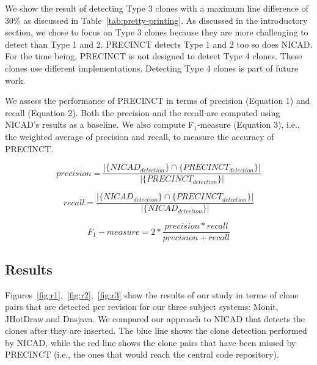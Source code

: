 \documentclass[conference]{IEEEtran}
\begin{document}
We show the result of detecting Type 3 clones with a maximum line difference of 30\% as discussed in Table~\ref{tab:pretty-printing}. As discussed in the introductory section, we chose to focus on Type 3 clones because they are more challenging to detect than Type 1 and 2. PRECINCT detects Type 1 and 2 too so does NICAD. For the time being, PRECINCT is not designed to detect Type 4 clones. These clones use different implementations. Detecting Type 4 clones is part of future work.


We assess the performance of PRECINCT in terms of precision (Equation 1) and recall (Equation 2).
Both the precision and the recall are computed using NICAD's results as a baseline.
We also compute F$_{1}$-measure (Equation 3), i.e., the weighted average of precision and recall, to measure the accuracy of PRECINCT.

\begin{equation}
precision = \frac{|\{ NICAD_{detection} \} \cap \{ PRECINCT_{detection} \} |}{| \{ PRECINCT_{detection} \}|}
\end{equation}

\begin{equation}
recall = \frac{|\{ NICAD_{detection} \} \cap \{ PRECINCT_{detection} \} |}{| \{ NICAD_{detection} \}|}
\end{equation}

\begin{equation}
F_1-measure = 2 * \frac{precision * recall}{precision + recall}
\end{equation}




\subsection{Results}
\label{sub:Results}

Figures~\ref{fig:r1},~\ref{fig:r2},~\ref{fig:r3} show the results of our study in terms of clone pairs that are detected per revision for our three subject systems: Monit, JHotDraw and Dnsjava. We compared our approach to NICAD that detects the clones after they are inserted. The blue line shows the clone detection performed by NICAD, while the red line shows the clone pairs that have been missed by PRECINCT (i.e., the ones that would reach the central code repository).


\end{document}
